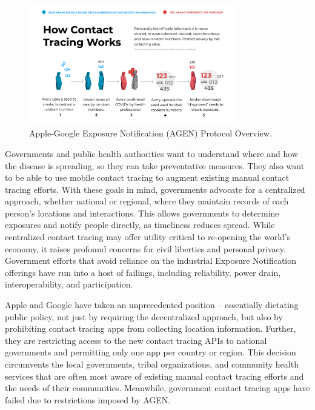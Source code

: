 \begin{figure}[t]
    \centering
    \includegraphics[width=0.8\textwidth]{figs/how_contact_tracing_works.pdf}
    \caption{Apple-Google Exposure Notification (AGEN) Protocol Overview.}
    \label{fig:contact_tracing}
\end{figure}

Governments and public health authorities want to understand where and how the disease is spreading, so they can take preventative measures.  
They also want to be able to use mobile contact tracing to augment existing manual contact tracing efforts.
With these goals in mind, governments advocate for a centralized approach, whether national or regional, where they maintain records of each person’s locations and interactions. 
This allows governments to determine exposures and notify people directly, as timeliness reduces spread. 
While centralized contact tracing may offer utility critical to re-opening the world’s economy, it raises profound concerns for civil liberties and personal privacy.
Government efforts that avoid reliance on the industrial Exposure Notification offerings have run into a host of failings, including reliability, power drain, interoperability, and participation.

Apple and Google have taken an unprecedented position -- essentially dictating public policy, not just by requiring the decentralized approach, but also by prohibiting contact tracing apps from collecting location information.
Further, they are restricting access to the new contact tracing APIs to national governments and permitting only one app per country or region. 
This decision circumvents the local governments, tribal organizations, and community health services that are often most aware of existing manual contact tracing efforts and the needs of their communities.  
Meanwhile, government contact tracing apps have failed due to restrictions imposed by AGEN.


